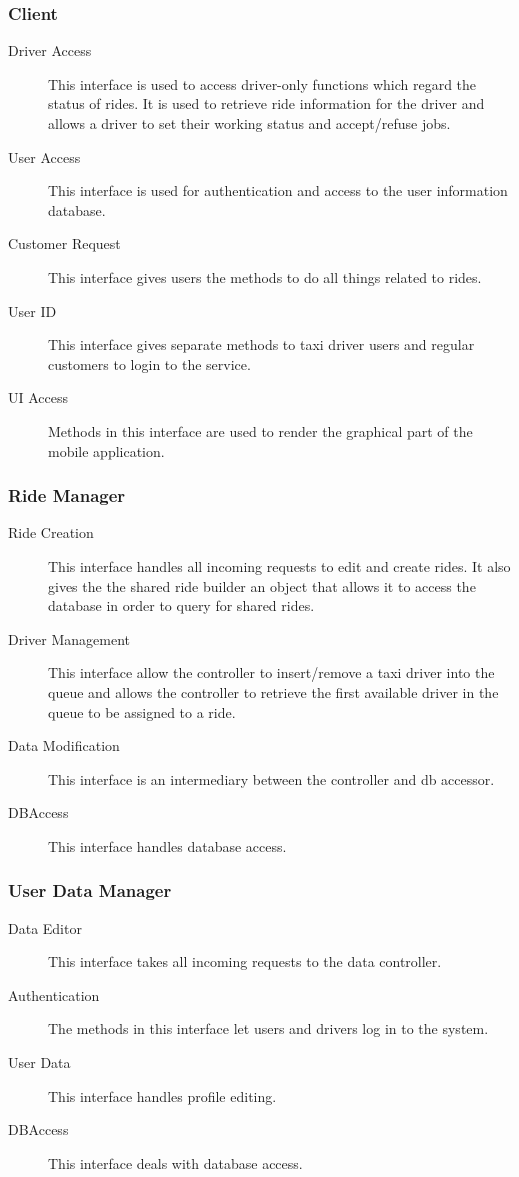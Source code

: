 	\subsubsection{Client}
		\begin{description}
			\item[Driver Access]
				This interface is used to access driver-only functions which regard the status of rides. It is used to retrieve ride information for the driver and allows a driver to set their working
				status and accept/refuse jobs.
			\item[User Access]
				This interface is used for authentication and access to the user information database.
			\item[Customer Request]
				This interface gives users the methods to do all things related to rides.
			\item[User ID]
				This interface gives separate methods to taxi driver users and regular customers to login to the service.
			\item[UI Access]
				Methods in this interface are used to render the graphical part of the mobile application.
		\end{description}
	\newpage
	\subsubsection{Ride Manager}
		\begin{description}
			\item[Ride Creation]
				This interface handles all incoming requests to edit and create rides. It also gives the the shared ride builder an object that allows it to access the database in order
				to query for shared rides.
			\item[Driver Management]
				This interface allow the controller to insert/remove a taxi driver into the queue and allows the controller to retrieve the first available driver in the queue to be assigned to
				a ride.
			\item[Data Modification]
				This interface is an intermediary between the controller and db accessor.
			\item[DBAccess]
				This interface handles database access.
		\end{description}
	\subsubsection{User Data Manager}
		\begin{description}
			\item[Data Editor]
				This interface takes all incoming requests to the data controller.
			\item[Authentication]
				The methods in this interface let users and drivers log in to the system.
			\item[User Data]
				This interface handles profile editing.
			\item[DBAccess]
				This interface deals with database access.
		\end{description}

